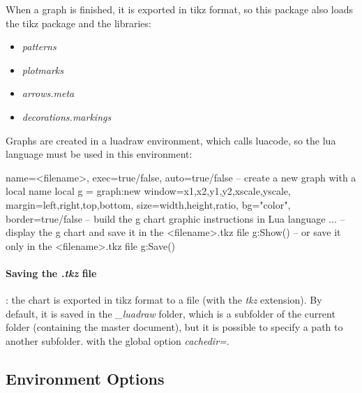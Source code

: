 When a graph is finished, it is exported in tikz format, so this package also loads the tikz package and the libraries:
\begin{itemize}
\item\emph{patterns}
\item\emph{plotmarks}
\item\emph{arrows.meta}
\item\emph{decorations.markings}
\end{itemize}

Graphs are created in a luadraw environment, which calls luacode, so the lua language must be used in this environment:

\begin{TeXcode}
\begin{luadraw}{ name=<filename>, exec=true/false, auto=true/false }
-- create a new graph with a local name
local g = graph:new{ window={x1,x2,y1,y2,xscale,yscale}, margin={left,right,top,bottom},
size={width,height,ratio}, bg="color", border=true/false }
-- build the g chart
graphic instructions in Lua language ...
-- display the g chart and save it in the <filename>.tkz file
g:Show()
-- or save it only in the <filename>.tkz file
g:Save()
\end{luadraw}
\end{TeXcode}

\paragraph{Saving the \emph{.tkz} file}: the chart is exported in tikz format to a file (with the \emph{tkz} extension). By default, it is saved in the \emph{\_luadraw} folder, which is a subfolder of the current folder (containing the master document), but it is possible to specify a path to another subfolder. with the global option \emph{cachedir=}.

\subsection{Environment Options}

